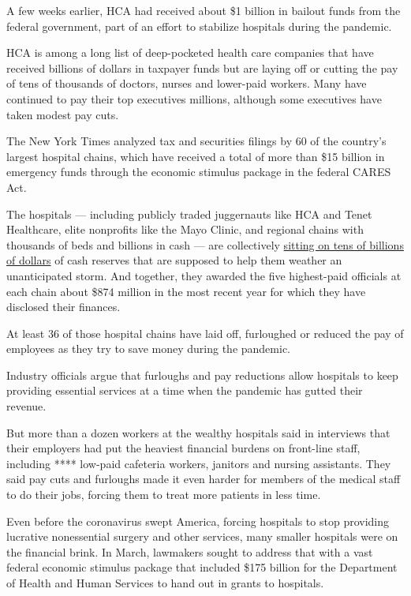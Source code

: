 A few weeks earlier, HCA had received about \$1 billion in bailout funds
from the federal government, part of an effort to stabilize hospitals
during the pandemic.

HCA is among a long list of deep-pocketed health care companies that
have received billions of dollars in taxpayer funds but are laying off
or cutting the pay of tens of thousands of doctors, nurses and
lower-paid workers. Many have continued to pay their top executives
millions, although some executives have taken modest pay cuts.

The New York Times analyzed tax and securities filings by 60 of the
country's largest hospital chains, which have received a total of more
than \$15 billion in emergency funds through the economic stimulus
package in the federal CARES Act.

The hospitals --- including publicly traded juggernauts like HCA and
Tenet Healthcare, elite nonprofits like the Mayo Clinic, and regional
chains with thousands of beds and billions in cash --- are collectively
\href{https://www.nytimes3xbfgragh.onion/2020/05/25/business/coronavirus-hospitals-bailout.html}{sitting
on tens of billions of dollars} of cash reserves that are supposed to
help them weather an unanticipated storm. And together, they awarded the
five highest-paid officials at each chain about \$874 million in the
most recent year for which they have disclosed their finances.

At least 36 of those hospital chains have laid off, furloughed or
reduced the pay of employees as they try to save money during the
pandemic.

Industry officials argue that furloughs and pay reductions allow
hospitals to keep providing essential services at a time when the
pandemic has gutted their revenue.

But more than a dozen workers at the wealthy hospitals said in
interviews that their employers had put the heaviest financial burdens
on front-line staff, including **** low-paid cafeteria workers, janitors
and nursing assistants. They said pay cuts and furloughs made it even
harder for members of the medical staff to do their jobs, forcing them
to treat more patients in less time.

Even before the coronavirus swept America, forcing hospitals to stop
providing lucrative nonessential surgery and other services, many
smaller hospitals were on the financial brink. In March, lawmakers
sought to address that with a vast federal economic stimulus package
that included \$175 billion for the Department of Health and Human
Services to hand out in grants to hospitals.

